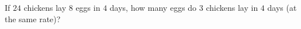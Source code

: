 If $24$ chickens lay $8$ eggs in $4$ days, how many eggs do $3$ chickens lay in $4$ days (at the same rate)?
